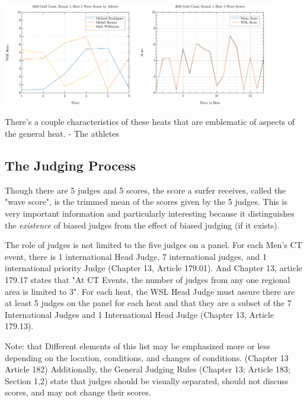 \documentclass{article}
\theoremstyle{definition}
\begin{document}
\includegraphics[width=6cm]{./src/visuals/2018GCR1/WaveScoresByAthH2.png}\includegraphics[width=6cm]{./src/visuals/2018GCR1/WaveScoresH2.png}

There's a couple characteristics of these heats that are emblematic of aspects of the general heat.
- The athletes 


\subsection{The Judging Process}
Though there are 5 judges and 5 scores, the score a surfer receives, called the "wave score", is the trimmed mean of the scores given by the 5 judges. This is very important information and particularly interesting because it distinguishes the \textit{existence} of biased judges from the effect of biased judging (if it exists).

The role of judges is not limited to the five judges on a panel. For each Men's CT event, there is 1 international Head Judge, 7 international judges, and 1 international priority Judge (Chapter 13, Article 179.01). And Chapter 13, article 179.17 states that "At CT Events, the number of judges from any one regional area is limited to 3". For each heat, the WSL Head Judge must assure there are at least 5 judges on the panel for each heat and that they are a subset of the 7 International Judges and 1 International Head Judge (Chapter 13, Article 179.13).

Note: that Different elements of this list may be emphasized more or less depending on the location, conditions, and changes of conditions. (Chapter 13 Article 182) Additionally, the General Judging Rules (Chapter 13; Article 183; Section 1,2) state that judges should be visually separated, should not discuss scores, and may not change their scores.
\end{document}
